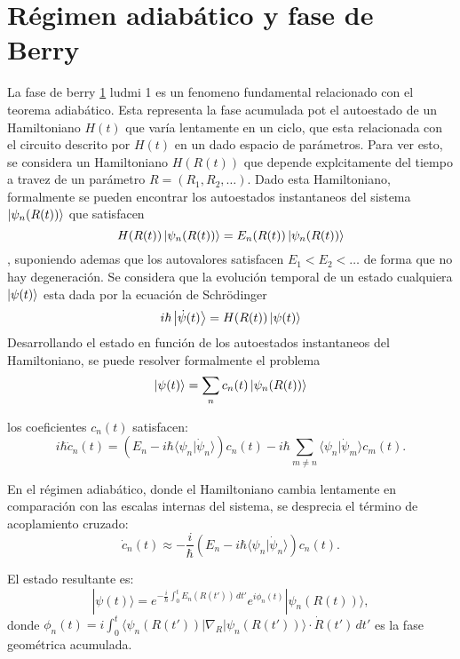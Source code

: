 \section{R\'egimen adiab\'atico y fase de Berry}
La fase de berry \ref{} ludmi 1 es un fenomeno fundamental relacionado con el teorema adiab\'atico. Esta representa la fase acumulada pot el autoestado de un Hamiltoniano $H(t)$ que var\'ia lentamente en un ciclo, que esta relacionada con el circuito descrito por $H(t)$ en un dado espacio de par\'ametros. \newline
Para ver esto, se considera un Hamiltoniano $H(R(t))$ que depende explcitamente del tiempo a travez de un parámetro $R=(R_1,R_2,\dots)$. Dado esta Hamiltoniano, formalmente se pueden encontrar los autoestados instantaneos del sistema $\ket{\psi_n(R(t))}$ que satisfacen
\begin{equation}
    H(R(t))\ket{\psi_n(R(t))}=E_n(R(t))\ket{\psi_n(R(t))}
\end{equation}
, suponiendo ademas que los autovalores satisfacen $E_1<E_2<\dots$ de forma que no hay degeneraci\'on. Se considera que la evoluci\'on temporal de un estado cualquiera $\ket{\psi(t)}$ esta dada por la ecuación de Schr\"odinger
\begin{equation}
    i \hbar \ket{\dot \psi(t)}=H(R(t))\ket{\psi(t)}
\end{equation}
Desarrollando el estado en funci\'on de los autoestados instantaneos del Hamiltoniano, se puede resolver formalmente el problema
\begin{equation}
    \ket{\psi(t)} = \sum_n c_n(t)\ket{\psi_n(R(t))}
\end{equation}

los coeficientes \( c_n(t) \) satisfacen:
\[
i \hbar \dot{c}_n(t) = \left( E_n - i \hbar \langle \psi_n | \dot{\psi}_n \rangle \right) c_n(t) - i \hbar \sum_{m \neq n} \langle \psi_n | \dot{\psi}_m \rangle c_m(t).
\]

En el régimen adiabático, donde el Hamiltoniano cambia lentamente en comparación con las escalas internas del sistema, se desprecia el término de acoplamiento cruzado:
\[
\dot{c}_n(t) \approx -\frac{i}{\hbar} \left( E_n - i \hbar \langle \psi_n | \dot{\psi}_n \rangle \right) c_n(t).
\]

El estado resultante es:
\[
| \psi(t) \rangle = e^{-\frac{i}{\hbar} \int_0^t E_n(R(t')) \, dt'} e^{i \phi_n(t)} | \psi_n(R(t)) \rangle,
\]
donde \( \phi_n(t) = i \int_0^t \langle \psi_n(R(t')) | \nabla_R | \psi_n(R(t')) \rangle \cdot \dot{R}(t') \, dt' \) es la fase geométrica acumulada.

